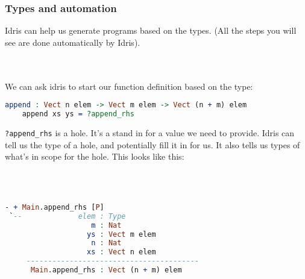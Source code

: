 \documentclass{beamer}
\begin{document}
\begin{frame}[fragile]
  \frametitle{Types and automation}

  Idris can help us generate programs based on the types. (All the steps you will see are done automatically by Idris).

  \pause \\~\\

  We can ask idris to start our function definition based on the type:

  \begin{lstlisting}[language=Idris]
    append : Vect n elem -> Vect m elem -> Vect (n + m) elem
    append xs ys = ?append_rhs
  \end{lstlisting}

  \pause
  \texttt{?append\_rhs} is a hole. It's a stand in for a value we need
  to provide. Idris can tell us the type of a hole, and potentially fill
  it in for us. It also tells us types of what's in scope for the hole. This looks like this:

  \pause \\~\\

  \begin{lstlisting}[language=Idris]
- + Main.append_rhs [P]
 `--             elem : Type
                    m : Nat
                   ys : Vect m elem
                    n : Nat
                   xs : Vect n elem
     ----------------------------------------
      Main.append_rhs : Vect (n + m) elem
  \end{lstlisting}

  
\end{frame}
\end{document}
